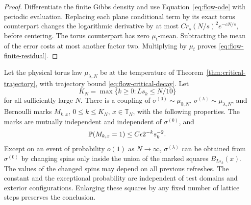 \begin{proof}
Differentiate the finite Gibbs density and use
Equation~\eqref{eq:flow-ode} with periodic evaluation.  Replacing each
plane conditional term by its exact torus counterpart changes the
logarithmic derivative by at most
\(Cr_s(N/s)^2e^{-cN/s}\), before centering.  The torus counterpart has
zero \(\mu_t\)-mean.  Subtracting the mean of the error costs at most
another factor two.  Multiplying by \(\mu_t\) proves
\eqref{eq:flow-finite-residual}.
\end{proof}

\begin{proposition}
\label{prop:edit-coupling}
Let the physical torus law \(\mu_{\lambda,N}\) be at the temperature of
Theorem~\ref{thm:critical-trajectory}, with trajectory bound
\eqref{eq:flow-critical-decay}.  Let
\[
 K_N=\max\{k\ge0:Ls_k\le N/10\}
\]
for all sufficiently large \(N\).  There is a coupling of
\(\sigma^{(0)}\sim\mu_{0,N}\),
\(\sigma^{(\lambda)}\sim\mu_{\lambda,N}\), and Bernoulli marks
\(M_{k,x}\), \(0\le k\le K_N\), \(x\in\mathbb T_N\), with the
following properties.  The marks are mutually independent and independent
of \(\sigma^{(0)}\), and
\begin{equation}\label{eq:flow-mark-probabilities}
 \P(M_{k,x}=1)\le C\epsilon2^{-k}s_k^{-2}.
\end{equation}
Except on an event of probability \(o(1)\) as \(N\to\infty\),
\(\sigma^{(\lambda)}\) can be obtained from \(\sigma^{(0)}\) by changing
spins only inside the union of the marked squares \(B_{Ls_k}(x)\).
The values of the changed spins may depend on all previous refreshes.
The constant and the exceptional probability are independent of test
domains and exterior configurations.  Enlarging these squares by any
fixed number of lattice steps preserves the conclusion.
\end{proposition}

